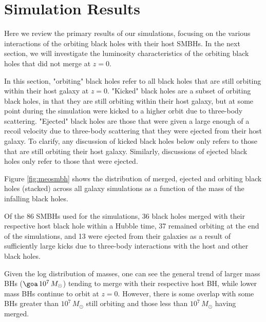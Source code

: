 \documentclass[fleqn,usenatbib,useAMS]{mnras}
\begin{document}
\section{Simulation Results}\label{sec:results}\label{sec:results_overview}
Here we review the primary results of our simulations, focusing on the various interactions of the orbiting black holes with their host SMBHs. In the next section, we will investigate the luminosity characteristics of the orbiting black holes that did not merge at $z=0$.

In this section, "orbiting" black holes refer to all black holes that are still orbiting within their host galaxy at $z=0$.  "Kicked" black holes are a subset of orbiting black holes, in that they are still orbiting within their host galaxy, but at some point during the simulation were kicked to a higher orbit due to three-body scattering.  "Ejected" black holes are those that were given a large enough of a recoil velocity due to three-body scattering that they were ejected from their host galaxy.  To clarify, any discussion of kicked black holes below only refers to those that are still orbiting their host galaxy.  Similarly, discussions of ejected black holes only refer to those that were ejected.

Figure \ref{fig:meosmbh} shows the distribution of merged, ejected and orbiting black holes (stacked) across all galaxy simulations as a function of the mass of the infalling black holes.

Of the 86 SMBHs used for the simulations, 36 black holes merged with their respective host black hole within a Hubble time, 37 remained orbiting at the end of the simulations, and 13 were ejected from their galaxies as a result of sufficiently large kicks due to three-body interactions with the host and other black holes.

Given the log distribution of masses, one can see the general trend of larger mass BHs ($\goa\, 10^7\, M_{\odot}$) tending to merge with their respective host BH, while lower mass BHs continue to orbit at $z=0$.  However, there is some overlap with some BHs greater than $10^7\, M_{\odot}$ still orbiting and those less than $10^7\, M_{\odot}$ having merged.
\end{document}
